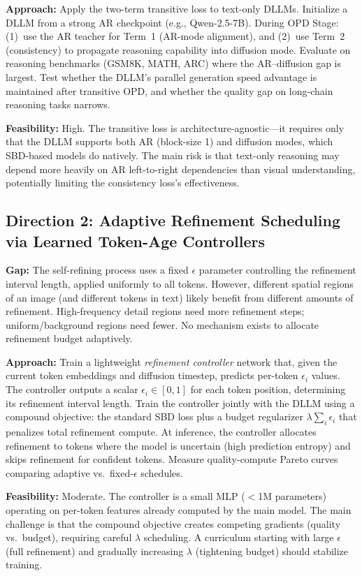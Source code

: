 \documentclass[11pt,a4paper]{article}
\begin{document}
\textbf{Approach:} Apply the two-term transitive loss to text-only DLLMs. Initialize a DLLM from a strong AR checkpoint (e.g., Qwen-2.5-7B). During OPD Stage: (1)~use the AR teacher for Term~1 (AR-mode alignment), and (2)~use Term~2 (consistency) to propagate reasoning capability into diffusion mode. Evaluate on reasoning benchmarks (GSM8K, MATH, ARC) where the AR--diffusion gap is largest. Test whether the DLLM's parallel generation speed advantage is maintained after transitive OPD, and whether the quality gap on long-chain reasoning tasks narrows.

\textbf{Feasibility:} High. The transitive loss is architecture-agnostic---it requires only that the DLLM supports both AR (block-size 1) and diffusion modes, which SBD-based models do natively. The main risk is that text-only reasoning may depend more heavily on AR left-to-right dependencies than visual understanding, potentially limiting the consistency loss's effectiveness.

\subsection{Direction 2: Adaptive Refinement Scheduling via Learned Token-Age Controllers}
\textbf{Gap:} The self-refining process uses a fixed $\epsilon$ parameter controlling the refinement interval length, applied uniformly to all tokens. However, different spatial regions of an image (and different tokens in text) likely benefit from different amounts of refinement. High-frequency detail regions need more refinement steps; uniform/background regions need fewer. No mechanism exists to allocate refinement budget adaptively.

\textbf{Approach:} Train a lightweight \emph{refinement controller} network that, given the current token embeddings and diffusion timestep, predicts per-token $\epsilon_i$ values. The controller outputs a scalar $\epsilon_i \in [0, 1]$ for each token position, determining its refinement interval length. Train the controller jointly with the DLLM using a compound objective: the standard SBD loss plus a budget regularizer $\lambda \sum_i \epsilon_i$ that penalizes total refinement compute. At inference, the controller allocates refinement to tokens where the model is uncertain (high prediction entropy) and skips refinement for confident tokens. Measure quality-compute Pareto curves comparing adaptive vs.\ fixed-$\epsilon$ schedules.

\textbf{Feasibility:} Moderate. The controller is a small MLP ($<$1M parameters) operating on per-token features already computed by the main model. The main challenge is that the compound objective creates competing gradients (quality vs.\ budget), requiring careful $\lambda$ scheduling. A curriculum starting with large $\epsilon$ (full refinement) and gradually increasing $\lambda$ (tightening budget) should stabilize training.
\end{document}
